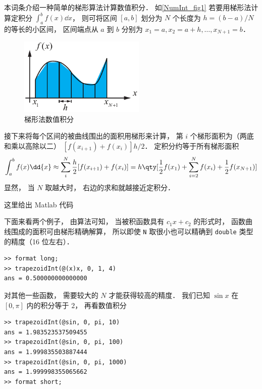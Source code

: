 

本词条介绍一种简单的梯形算法计算数值积分． 如\autoref{NumInt_fig1} 若要用梯形法计算定积分 $\int_a^b f(x) \dd{x}$， 则可将区间 $[a, b]$ 划分为 $N$ 个长度为 $h = (b-a)/N$ 的等长的小区间， 区间端点从 $a$ 到 $b$ 分别为 $x_1 = a, x_2 = a + h, \dots, x_{N+1} = b$．

\begin{figure}[ht]
\centering
\includegraphics[width=6cm]{./figures/NumInt_1.pdf}
\caption{梯形法数值积分} \label{NumInt_fig1}
\end{figure}

接下来将每个区间的被曲线围出的面积用梯形来计算， 第 $i$ 个梯形面积为（两底和乘以高除以二）
$[f(x_{i+1}) + f(x_i)]h/2$． 定积分约等于所有梯形面积
\begin{equation}
\int_a^b f(x) \dd{x} \approx \sum_i^N  \frac h2 [f(x_{i+1}) + f(x_i)]
= h\qty[ \frac12 f(x_1) + \sum_{i = 2}^N f(x_i) + \frac12 f(x_{N+1})]
\end{equation}
显然， 当 $N$ 取越大时， 右边的求和就越接近定积分．

这里给出 Matlab 代码

下面来看两个例子， 由算法可知， 当被积函数具有 $c_1 x + c_2$ 的形式时， 函数曲线围成的面积可由梯形精确解算， 所以即使 \lstinline|N| 取很小也可以精确到 \lstinline|double| 类型的精度（16 位左右）．
\begin{lstlisting}[language=MatlabCom]
>> format long;
>> trapezoidInt(@(x)x, 0, 1, 4)
ans = 0.500000000000000
\end{lstlisting}
对其他一些函数， 需要较大的 $N$ 才能获得较高的精度． 我们已知 $\sin x$ 在 $[0, \pi]$ 内的积分等于 $2$， 再看数值积分
\begin{lstlisting}[language=MatlabCom]
>> trapezoidInt(@sin, 0, pi, 10)
ans = 1.983523537509455
>> trapezoidInt(@sin, 0, pi, 100)
ans = 1.999835503887444
>> trapezoidInt(@sin, 0, pi, 1000)
ans = 1.999998355065662
>> format short;
\end{lstlisting}
